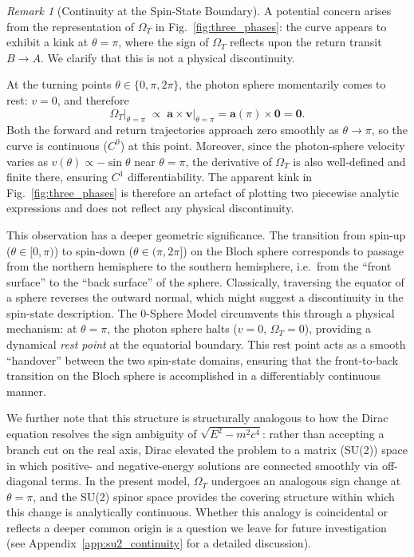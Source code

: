 \documentclass[%
 reprint,
 amsmath,amssymb,
 aps,
 prb,
]{revtex4-2}
\numberwithin{equation}{section}
\theoremstyle{definition}
\theoremstyle{remark}
\newtheorem{remark}{Remark}[section]
\begin{document}
\begin{remark}[Continuity at the Spin-State Boundary]
\label{rem:continuity}
A potential concern arises from the representation of $\Omega_T$ in
Fig.~\ref{fig:three_phases}: the curve appears to exhibit a kink at $\theta = \pi$,
where the sign of $\Omega_T$ reflects upon the return transit $B \to A$.
We clarify that this is not a physical discontinuity.

At the turning points $\theta \in \{0, \pi, 2\pi\}$, the photon sphere momentarily
comes to rest: $v = 0$, and therefore
\begin{equation}
\Omega_T\big|_{\theta = \pi} \;\propto\; \bm{a} \times \bm{v}\big|_{\theta=\pi}
= \bm{a}(\pi) \times \mathbf{0} = \mathbf{0}.
\label{eq:omega_zero}
\end{equation}
Both the forward and return trajectories approach zero smoothly as $\theta \to \pi$,
so the curve is continuous ($C^0$) at this point.
Moreover, since the photon-sphere velocity varies as $v(\theta) \propto -\sin\theta$
near $\theta = \pi$, the derivative of $\Omega_T$ is also well-defined and finite there,
ensuring $C^1$ differentiability.
The apparent kink in Fig.~\ref{fig:three_phases} is therefore an artefact of plotting
two piecewise analytic expressions and does not reflect any physical discontinuity.

This observation has a deeper geometric significance.
The transition from spin-up ($\theta \in [0, \pi)$) to spin-down ($\theta \in (\pi, 2\pi]$)
on the Bloch sphere corresponds to passage from the northern hemisphere to the southern
hemisphere, i.e.\ from the ``front surface'' to the ``back surface'' of the sphere.
Classically, traversing the equator of a sphere reverses the outward normal, which might
suggest a discontinuity in the spin-state description.
The 0-Sphere Model circumvents this through a physical mechanism: at $\theta = \pi$,
the photon sphere halts ($v = 0$, $\Omega_T = 0$), providing a dynamical
\emph{rest point} at the equatorial boundary.
This rest point acts as a smooth ``handover'' between the two spin-state domains,
ensuring that the front-to-back transition on the Bloch sphere is accomplished
in a differentiably continuous manner.

We further note that this structure is structurally analogous to how the Dirac equation
resolves the sign ambiguity of $\sqrt{E^2 - m^2c^4}$: rather than accepting a branch cut
on the real axis, Dirac elevated the problem to a matrix (SU(2)) space in which
positive- and negative-energy solutions are connected smoothly via off-diagonal terms.
In the present model, $\Omega_T$ undergoes an analogous sign change at $\theta = \pi$,
and the SU(2) spinor space provides the covering structure within which this change is
analytically continuous.
Whether this analogy is coincidental or reflects a deeper common origin is a question
we leave for future investigation (see Appendix~\ref{app:su2_continuity} for a
detailed discussion).
\end{remark}
\end{document}
